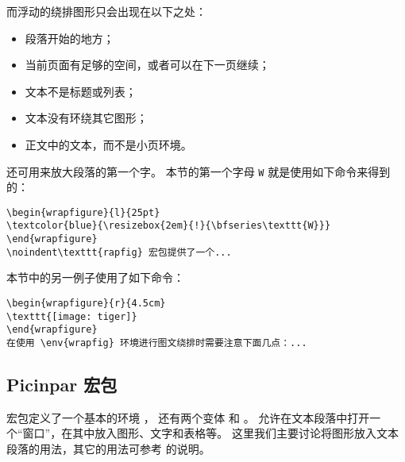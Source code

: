 而浮动的绕排图形只会出现在以下之处：
\begin{itemize}
	\item 段落开始的地方；
	\item 当前页面有足够的空间，或者可以在下一页继续；
	\item 文本不是标题或列表；
	\item 文本没有环绕其它图形；
	\item 正文中的文本，而不是小页环境。
\end{itemize}

 还可用来放大段落的第一个字。
本节的第一个字母 \texttt{W} 就是使用如下命令来得到的：
\begin{lstlisting}
\begin{wrapfigure}{l}{25pt}
\textcolor{blue}{\resizebox{2em}{!}{\bfseries\texttt{W}}}
\end{wrapfigure}
\noindent\texttt{rapfig} 宏包提供了一个...
\end{lstlisting}

本节中的另一例子使用了如下命令：
\begin{lstlisting}
\begin{wrapfigure}{r}{4.5cm}
\texttt{[image: tiger]}
\end{wrapfigure}
在使用 \env{wrapfig} 环境进行图文绕排时需要注意下面几点：...
\end{lstlisting}


\subsection{Picinpar 宏包}\label{ssec:picinpar}

 宏包定义了一个基本的环境 ，
还有两个变体  和 。
允许在文本段落中打开一个“窗口”，在其中放入图形、文字和表格等。
这里我们主要讨论将图形放入文本段落的用法，其它的用法可参考  的说明。

\begin{flushleft}
\\
\qquad{}\\
\end{flushleft}

\begin{flushleft}
	\\
	\qquad{}\\
\end{flushleft}

